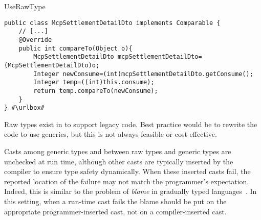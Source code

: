 \begin{pattern}{UseRawType}
\def\urlvar{http://bit.ly/fangjie008_tiexue_mcp_parent_2FSZKzm}
\begin{verbatim}
public class McpSettlementDetailDto implements Comparable {
    // [...]
    @Override
    public int compareTo(Object o){
        McpSettlementDetailDto mcpSettlementDetailDto=(McpSettlementDetailDto)o;
        Integer newConsume=(int)mcpSettlementDetailDto.getConsume();
        Integer temp=((int)this.consume);
        return temp.compareTo(newConsume);
    }
} #\urlbox#
\end{verbatim}

\issues{}
Raw types exist in \java{} to support legacy code.
Best practice would be to rewrite the code to use generics,
but this is not always feasible or cost effective.

Casts among generic types and between raw types and generic types are unchecked at run time,
although other casts are typically inserted by the compiler to ensure type safety dynamically.
When these inserted casts fail, the reported location of the failure may not match the programmer's expectation.
Indeed, this is similar to the problem of \emph{blame} in gradually typed languages~\citep{wadlerWellTypedProgramsCan2009}.
In this setting, when a run-time cast fails the blame should be put on the appropriate programmer-inserted cast,
not on a compiler-inserted cast.

\end{pattern}
